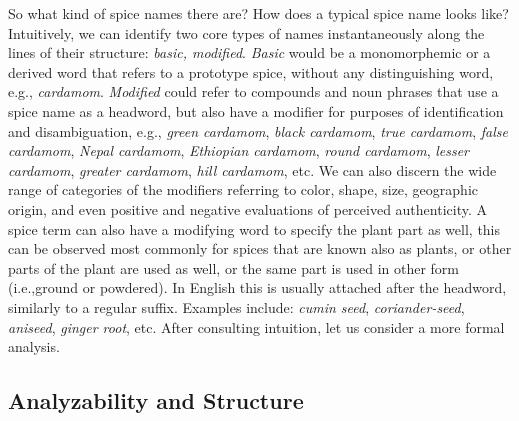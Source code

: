 So what kind of spice names there are? How does a typical spice name looks like? Intuitively, we can identify two core types of names instantaneously along the lines of their structure: \textit{basic, modified}. \textit{Basic} would be a monomorphemic or a derived word that refers to a prototype spice, without any distinguishing word, e.g., \textit{cardamom}. \textit{Modified} could refer to compounds and noun phrases that use a spice name as a headword, but also have a modifier for purposes of identification and disambiguation, e.g., \textit{green cardamom}, \textit{black cardamom}, \textit{true cardamom}, \textit{false cardamom}, \textit{Nepal cardamom}, \textit{Ethiopian cardamom}, \textit{round cardamom}, \textit{lesser cardamom}, \textit{greater cardamom}, \textit{hill cardamom}, etc. We can also discern the wide range of categories of the modifiers referring to color, shape, size, geographic origin, and even positive and negative evaluations of perceived authenticity. A spice term can also have a modifying word to specify the plant part as well, this can be observed most commonly for spices that are known also as plants, or other parts of the plant are used as well, or the same part is used in other form (i.e.,ground or powdered). In English this is usually attached after the headword, similarly to a regular suffix. Examples include: \textit{cumin seed}, \textit{coriander-seed}, \textit{aniseed}, \textit{ginger root}, etc. After consulting intuition, let us consider a more formal analysis.



\subsection{Analyzability and Structure}

